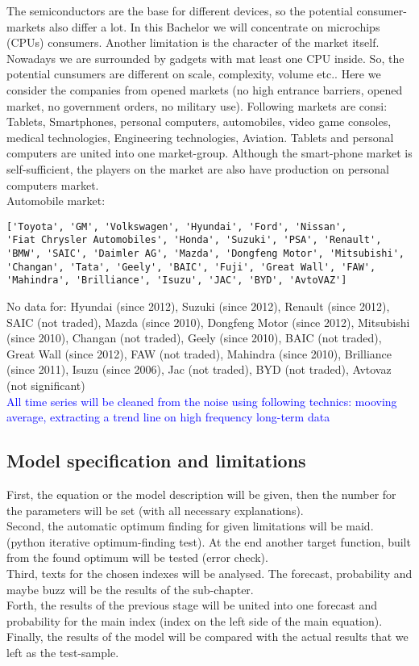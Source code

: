 \documentclass {article}
\begin{document}
The semiconductors are the base for different devices, so the potential consumer-markets also differ a lot. In this Bachelor we will concentrate on microchips (CPUs) consumers. Another limitation is the character of the market itself. Nowadays we are surrounded by gadgets with mat least one CPU inside. So, the potential cunsumers are different on scale, complexity, volume etc.. Here we consider the companies from opened markets (no high entrance barriers, opened market, no government orders, no military use). Following markets are consi: Tablets, Smartphones, personal computers, automobiles, video game consoles, medical technologies, Engineering technologies, Aviation. Tablets and personal computers are united into one market-group. Although the smart-phone market is self-sufficient, the players on the market are also have production on personal computers market.\\
Automobile market:
\begin{verbatim}
['Toyota', 'GM', 'Volkswagen', 'Hyundai', 'Ford', 'Nissan', 
'Fiat Chrysler Automobiles', 'Honda', 'Suzuki', 'PSA', 'Renault', 
'BMW', 'SAIC', 'Daimler AG', 'Mazda', 'Dongfeng Motor', 'Mitsubishi',
'Changan', 'Tata', 'Geely', 'BAIC', 'Fuji', 'Great Wall', 'FAW',
'Mahindra', 'Brilliance', 'Isuzu', 'JAC', 'BYD', 'AvtoVAZ']
\end{verbatim}
No data for: Hyundai (since 2012), Suzuki (since 2012), Renault (since 2012), SAIC (not traded), Mazda (since 2010), Dongfeng Motor (since 2012), Mitsubishi (since 2010), Changan (not traded), Geely (since 2010), BAIC (not traded), Great Wall (since 2012), FAW (not traded), Mahindra (since 2010), Brilliance (since 2011), Isuzu (since 2006), Jac (not traded), BYD (not traded), Avtovaz (not significant)\\ 
\textcolor{blue}{All time series will be cleaned from the noise using following technics: mooving average, extracting a trend line on high frequency long-term data} 
\subsection{Model specification and limitations}
First, the equation or the model description will be given, then the number for the parameters will be set (with all necessary explanations).\\
Second, the automatic optimum finding for given limitations will be maid. (python iterative optimum-finding test). At the end another target function, built from the found optimum will be tested (error check).\\
Third, texts for the chosen indexes will be analysed. The forecast, probability and maybe buzz will be the results of the sub-chapter.\\
Forth, the results of the previous stage will be united into one forecast and probability for the main index (index on the left side of the main equation).\\
Finally, the results of the model will be compared with the actual results that we left as the test-sample.
\end{document}
